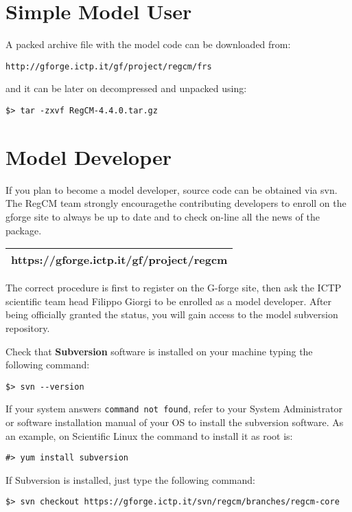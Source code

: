 %
%

\section{Simple Model User}

A packed archive file with the model code can be downloaded from:

\begin{Verbatim}
http://gforge.ictp.it/gf/project/regcm/frs
\end{Verbatim}

and it can be later on decompressed and unpacked using:

\begin{Verbatim}
$> tar -zxvf RegCM-4.4.0.tar.gz
\end{Verbatim}

\section{Model Developer}

If you plan to become a model developer, source code can be obtained via svn.
The RegCM team strongly encouragethe contributing developers to enroll on
the gforge site to always be up to date and to check on-line all the news of
the package.

\vspace{0.5cm}
\begin{tabular}{|c|}
\hline
{\bf https://gforge.ictp.it/gf/project/regcm} \\
\hline
\end{tabular}
\vspace{0.5cm}

The correct procedure is first to register on the G-forge site, then ask
the ICTP scientific team head Filippo Giorgi to be enrolled as a model
developer. After being officially granted the status, you will gain
access to the model subversion repository.

Check that {\bf Subversion} software is installed on your machine typing
the following command:

\begin{verbatim}
$> svn --version
\end{verbatim}

If your system answers \verb=command not found=, refer to your System
Administrator or software installation manual of your OS to install the
subversion software. As an example, on Scientific Linux the command
to install it as root is:

\begin{verbatim}
#> yum install subversion
\end{verbatim}

If Subversion is installed, just type the following command:

\begin{verbatim}
$> svn checkout https://gforge.ictp.it/svn/regcm/branches/regcm-core
\end{verbatim}
